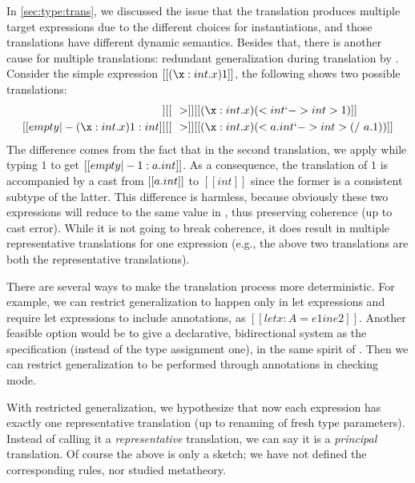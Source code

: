 In \cref{sec:type:trans}, we discussed the issue that the translation produces
multiple target expressions due to the different choices for instantiations, and
those translations have different dynamic semantics. Besides that, there is
another cause for multiple translations: redundant generalization during
translation by . Consider the simple expression $[[(\x:int. x) 1]]$,
the following shows two possible translations:
\begin{align*}
  [[empty |- (\x : int . x) 1 : int ]] &[[~~>]] [[ (\x : int . x) (<int `-> int> 1)]]
  \\
  [[empty |- (\x : int . x) 1 : int ]] &[[~~>]]  [[ (\x : int . x) (<\/ a. int `-> int> (/\ a. 1))]]
\end{align*}
The difference comes from the fact that in the second translation, we apply
 while typing $1$ to get $[[empty |- 1 : \/ a. int]]$. As a consequence, the translation of $1$
is accompanied by a cast from $[[\/ a. int]]$ to $[[int]]$ since the former is a
consistent subtype of the latter. This difference is harmless, because obviously
these two expressions will reduce to the same value in \pbc, thus preserving
coherence (up to cast error). While it is not going to break coherence,
it does result in multiple representative translations for one
expression (e.g., the above two translations are both the representative translations).

There are several ways to make the translation process more deterministic. For
example, we can restrict generalization to happen only in let expressions and
require let expressions to include annotations, as $[[ let x : A = e1 in e2 ]]$.
Another feasible option would be to give a declarative, bidirectional system as
the specification (instead of the type assignment one), in the same spirit of
\citet{dunfield2013complete}. Then we can restrict generalization to be
performed through annotations in checking mode.

With restricted generalization, we hypothesize that now each expression has exactly
one representative translation (up to renaming of fresh type parameters).
Instead of calling it a \textit{representative} translation, we can say it is a
\textit{principal} translation. Of course the above is only a sketch; we have
not defined the corresponding rules, nor studied metatheory.


